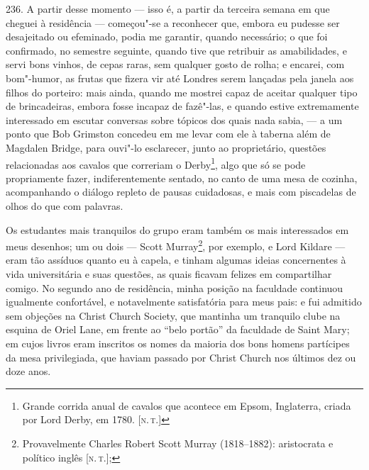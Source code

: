 236. A partir desse momento --- isso é, a partir da terceira semana em
que cheguei à residência --- começou"-se a reconhecer que, embora eu
pudesse ser desajeitado ou efeminado, podia me garantir, quando
necessário; o que foi confirmado, no semestre seguinte, quando tive que
retribuir as amabilidades, e servi bons vinhos, de cepas raras, sem
qualquer gosto de rolha; e encarei, com bom"-humor, as frutas que fizera
vir até Londres serem lançadas pela janela aos filhos do porteiro: mais
ainda, quando me mostrei capaz de aceitar qualquer tipo de brincadeiras,
embora fosse incapaz de fazê"-las, e quando estive extremamente
interessado em escutar conversas sobre tópicos dos quais nada sabia, ---
a um ponto que Bob Grimston concedeu em me levar com ele à taberna além
de Magdalen Bridge, para ouvi"-lo esclarecer, junto ao proprietário,
questões relacionadas aos cavalos que correriam o Derby\footnote{Grande
  corrida anual de cavalos que acontece em Epsom, Inglaterra, criada por
  Lord Derby, em 1780. {[}\textsc{n.\,t.}{]}}, algo que só se pode propriamente
fazer, indiferentemente sentado, no canto de uma mesa de cozinha,
acompanhando o diálogo repleto de pausas cuidadosas, e mais com
piscadelas de olhos do que com palavras.

Os estudantes mais tranquilos do grupo eram também os mais interessados
em meus desenhos; um ou dois --- Scott Murray\footnote{Provavelmente
  Charles Robert Scott Murray (1818--1882): aristocrata e político inglês
  {[}\textsc{n.\,t.}{]};}, por exemplo, e Lord Kildare --- eram tão assíduos
quanto eu à capela, e tinham algumas ideias concernentes à vida
universitária e suas questões, as quais ficavam felizes em compartilhar
comigo. No segundo ano de residência, minha posição na faculdade
continuou igualmente confortável, e notavelmente satisfatória para meus
pais: e fui admitido sem objeções na Christ Church Society, que mantinha
um tranquilo clube na esquina de Oriel Lane, em frente ao ``belo
portão'' da faculdade de Saint Mary; em cujos livros eram inscritos os
nomes da maioria dos bons homens partícipes da mesa privilegiada, que
haviam passado por Christ Church nos últimos dez ou doze anos.

